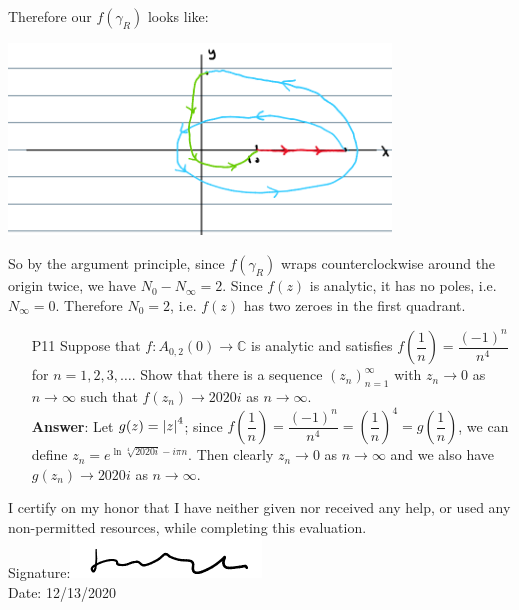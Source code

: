 \documentclass{article}
\begin{document}
\begin{itemize}
\begin{center}
\begin{tabular}{c|c|c|c|c}
                        \hline\hline
                  \end{tabular}
            \end{center}
            Therefore our $f(\gamma_R)$ looks like:
            \begin{center}
                  \includegraphics[width=4in]{p9-3.png}
            \end{center}
            So by the argument principle, since $f(\gamma_R)$ wraps counterclockwise around the origin twice, we have $N_0-N_\infty=2$. Since $f(z)$ is analytic, it has no poles, i.e. $N_\infty=0$. Therefore $N_0=2$, i.e. $f(z)$ has two zeroes in the first quadrant.
\end{itemize}

\newpage
\begin{itemize}
      \item [P11] Suppose that $f:A_{0,2}(0)\rightarrow\mathbb{C}$ is analytic and satisfies $f\left(\dfrac{1}{n}\right)=\dfrac{(-1)^n}{n^4}$ for $n=1,2,3,\ldots$. Show that there is a sequence $(z_n)_{n=1}^\infty$ with $z_n\rightarrow 0$ as $n\rightarrow\infty$ such that $f(z_n)\rightarrow 2020i$ as $n\rightarrow\infty$.\\
            \textbf{Answer}: Let $g(z)=\abs{z}^4$; since $f\left(\dfrac{1}{n}\right)=\dfrac{(-1)^n}{n^4}=\left(\dfrac{1}{n}\right)^4=g\left(\dfrac{1}{n}\right)$, we can define $z_n=e^{\ln\sqrt[4]{2020i}-i\pi n}$. Then clearly $z_n\rightarrow 0$ as $n\rightarrow\infty$ and we also have $g(z_n)\rightarrow 2020i$ as $n\rightarrow\infty$.
\end{itemize}

\newpage
I certify on my honor that I have neither given nor received any help, or used any non-permitted resources, while completing this evaluation.\\
Signature:\includegraphics[width=2in]{signature.png}\\
Date: 12/13/2020
\end{document}
